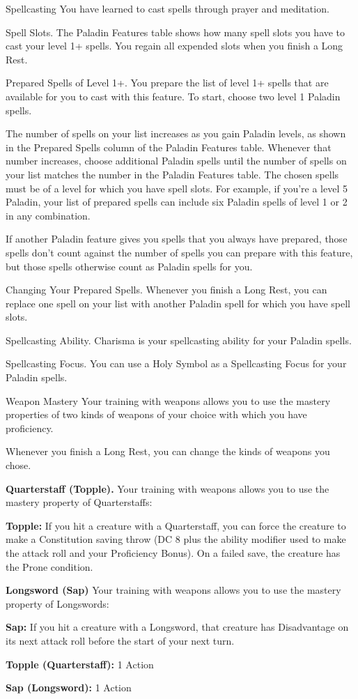 \begin{DndComment}[]{Spellcasting}
	You have learned to cast spells through prayer and meditation.
	
	Spell Slots. The Paladin Features table shows how many spell slots you have to cast your level 1+ spells. You regain all expended slots when you finish a Long Rest.
	
	Prepared Spells of Level 1+. You prepare the list of level 1+ spells that are available for you to cast with this feature. To start, choose two level 1 Paladin spells.
	
	The number of spells on your list increases as you gain Paladin levels, as shown in the Prepared Spells column of the Paladin Features table. Whenever that number increases, choose additional Paladin spells until the number of spells on your list matches the number in the Paladin Features table. The chosen spells must be of a level for which you have spell slots. For example, if you’re a level 5 Paladin, your list of prepared spells can include six Paladin spells of level 1 or 2 in any combination.
	
	If another Paladin feature gives you spells that you always have prepared, those spells don’t count against the number of spells you can prepare with this feature, but those spells otherwise count as Paladin spells for you.
	
	Changing Your Prepared Spells. Whenever you finish a Long Rest, you can replace one spell on your list with another Paladin spell for which you have spell slots.
	
	Spellcasting Ability. Charisma is your spellcasting ability for your Paladin spells.
	
	Spellcasting Focus. You can use a Holy Symbol as a Spellcasting Focus for your Paladin spells.
\end{DndComment}

\begin{DndComment}[]{Weapon Mastery}
	Your training with weapons allows you to use the mastery properties of two kinds of weapons of your choice with which you have proficiency.
	
	Whenever you finish a Long Rest, you can change the kinds of weapons you chose.
	
	\textbf{Quarterstaff (Topple).} Your training with weapons allows you to use the mastery property of Quarterstaffs:
	
	\textbf{Topple:} If you hit a creature with a Quarterstaff, you can force the creature to make a Constitution saving throw (DC 8 plus the ability modifier used to make the attack roll and your Proficiency Bonus). On a failed save, the creature has the Prone condition.
	
	\textbf{Longsword (Sap)} Your training with weapons allows you to use the mastery property of Longswords:
	
	\textbf{Sap:} If you hit a creature with a Longsword, that creature has Disadvantage on its next attack roll before the start of your next turn.
	
	\textbf{Topple (Quarterstaff):} 1 Action
	
	\textbf{Sap (Longsword):} 1 Action

\end{DndComment}


